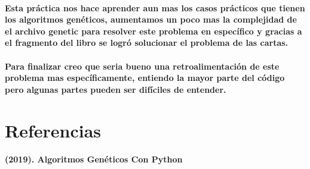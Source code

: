 \documentclass[10pt,a4paper]{article}
\begin{document}
\paragraph{
Esta pr\'actica nos hace aprender aun mas los casos pr\'acticos que tienen los algoritmos gen\'eticos, aumentamos un poco mas la complejidad de el archivo genetic para resolver este problema en espec\'ifico y gracias a el fragmento del libro se logr\'o solucionar el problema de las cartas.}
\paragraph{
Para finalizar creo que seria bueno una retroalimentaci\'on de este problema mas espec\'ificamente, entiendo la mayor parte del c\'odigo pero algunas partes pueden ser dif\'iciles de entender.
}
\section{Referencias}
\paragraph{(2019). Algoritmos Gen\'eticos Con Python}
\end{document}
